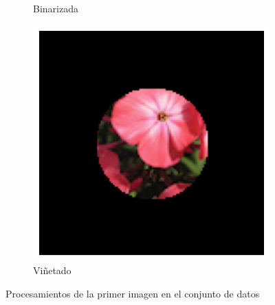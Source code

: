 \documentclass{article}
\begin{document}
\begin{figure}
\begin{subfigure}[b]{0.24\textwidth}
		\caption{Binarizada}
		\label{fg:imgGrau0binarizada}
	\end{subfigure}
	\begin{subfigure}[b]{0.24\textwidth}
		\includegraphics[width= \textwidth]{circle}
		\caption{Viñetado}
		\label{fg:circle}
	\end{subfigure}
	\caption{Procesamientos de la primer imagen en el conjunto de datos}
\end{figure}
\end{document}
